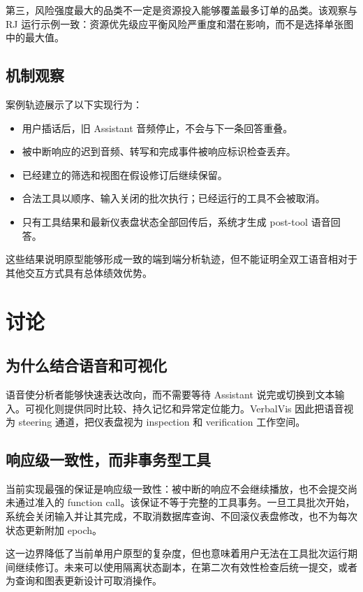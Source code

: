 \documentclass[UTF8,a4paper,10.5pt]{ctexart}
\begin{document}
第三，风险强度最大的品类不一定是资源投入能够覆盖最多订单的品类。该观察与 RJ 运行示例一致：资源优先级应平衡风险严重度和潜在影响，而不是选择单张图中的最大值。

\subsection{机制观察}

案例轨迹展示了以下实现行为：

\begin{itemize}
\item 用户插话后，旧 Assistant 音频停止，不会与下一条回答重叠。
\item 被中断响应的迟到音频、转写和完成事件被响应标识检查丢弃。
\item 已经建立的筛选和视图在假设修订后继续保留。
\item 合法工具以顺序、输入关闭的批次执行；已经运行的工具不会被取消。
\item 只有工具结果和最新仪表盘状态全部回传后，系统才生成 post-tool 语音回答。
\end{itemize}

这些结果说明原型能够形成一致的端到端分析轨迹，但不能证明全双工语音相对于其他交互方式具有总体绩效优势。

\section{讨论}

\subsection{为什么结合语音和可视化}

语音使分析者能够快速表达改向，而不需要等待 Assistant 说完或切换到文本输入。可视化则提供同时比较、持久记忆和异常定位能力。VerbalVis 因此把语音视为 steering 通道，把仪表盘视为 inspection 和 verification 工作空间。

\subsection{响应级一致性，而非事务型工具}

当前实现最强的保证是响应级一致性：被中断的响应不会继续播放，也不会提交尚未通过准入的 function call。该保证不等于完整的工具事务。一旦工具批次开始，系统会关闭输入并让其完成，不取消数据库查询、不回滚仪表盘修改，也不为每次状态更新附加 epoch。

这一边界降低了当前单用户原型的复杂度，但也意味着用户无法在工具批次运行期间继续修订。未来可以使用隔离状态副本，在第二次有效性检查后统一提交，或者为查询和图表更新设计可取消操作。
\end{document}
